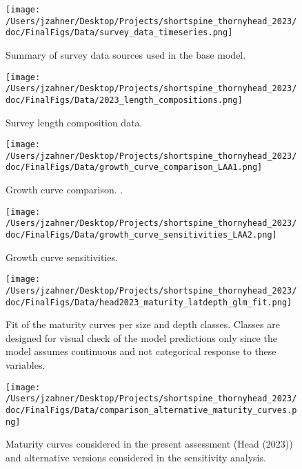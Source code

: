 \documentclass[11pt,
  english,
  letterpaper,
]{article}
\begin{document}
\begin{figure}
\centering
\texttt{[image: /Users/jzahner/Desktop/Projects/shortspine\_thornyhead\_2023/doc/FinalFigs/Data/survey\_data\_timeseries.png]}
\caption{Summary of survey data sources used in the base model.\label{fig:survey_data_timeseries}}
\end{figure}

\begin{figure}
\centering
\texttt{[image: /Users/jzahner/Desktop/Projects/shortspine\_thornyhead\_2023/doc/FinalFigs/Data/2023\_length\_compositions.png]}
\caption{Survey length composition data.\label{fig:survey_comps}}
\end{figure}

\begin{figure}
\centering
\texttt{[image: /Users/jzahner/Desktop/Projects/shortspine\_thornyhead\_2023/doc/FinalFigs/Data/growth\_curve\_comparison\_LAA1.png]}
\caption{Growth curve comparison. .\label{fig:growth_LAA1}}
\end{figure}

\begin{figure}
\centering
\texttt{[image: /Users/jzahner/Desktop/Projects/shortspine\_thornyhead\_2023/doc/FinalFigs/Data/growth\_curve\_sensitivities\_LAA2.png]}
\caption{Growth curve sensitivities.\label{fig:growth_LAA2}}
\end{figure}

\begin{figure}
\centering
\texttt{[image: /Users/jzahner/Desktop/Projects/shortspine\_thornyhead\_2023/doc/FinalFigs/Data/head2023\_maturity\_latdepth\_glm\_fit.png]}
\caption{Fit of the maturity curves per size and depth classes. Classes are designed for visual check of the model predictions only since the model assumes continuous and not categorical response to these variables.\label{fig:mat1}}
\end{figure}

\begin{figure}
\centering
\texttt{[image: /Users/jzahner/Desktop/Projects/shortspine\_thornyhead\_2023/doc/FinalFigs/Data/comparison\_alternative\_maturity\_curves.png]}
\caption{Maturity curves considered in the present assessment (Head (2023)) and alternative versions considered in the sensitivity analysis.\label{fig:mat2}}
\end{figure}
\end{document}
